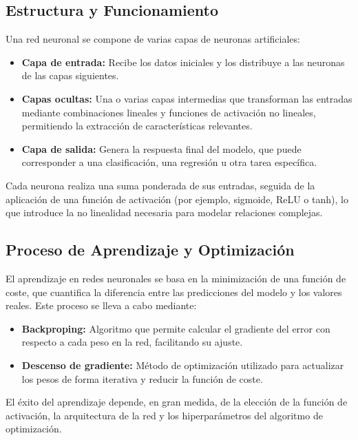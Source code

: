 \documentclass[11pt,spanish,listoffigures,listoftables]{tfgetsinf}
\begin{document}
\subsection{Estructura y Funcionamiento}
Una red neuronal se compone de varias capas de neuronas artificiales:
\begin{itemize}
    \item \textbf{Capa de entrada:} Recibe los datos iniciales y los distribuye a las neuronas de las capas siguientes.
    \item \textbf{Capas ocultas:} Una o varias capas intermedias que transforman las entradas mediante combinaciones lineales y funciones de activación no lineales, permitiendo la extracción de características relevantes.
    \item \textbf{Capa de salida:} Genera la respuesta final del modelo, que puede corresponder a una clasificación, una regresión u otra tarea específica.
\end{itemize}
Cada neurona realiza una suma ponderada de sus entradas, seguida de la aplicación de una función de activación (por ejemplo, sigmoide, ReLU o tanh), lo que introduce la no linealidad necesaria para modelar relaciones complejas.

\subsection{Proceso de Aprendizaje y Optimización}
El aprendizaje en redes neuronales se basa en la minimización de una función de coste, que cuantifica la diferencia entre las predicciones del modelo y los valores reales. Este proceso se lleva a cabo mediante:
\begin{itemize}
    \item \textbf{Backproping:} Algoritmo que permite calcular el gradiente del error con respecto a cada peso en la red, facilitando su ajuste.
    \item \textbf{Descenso de gradiente:} Método de optimización utilizado para actualizar los pesos de forma iterativa y reducir la función de coste.
\end{itemize}
El éxito del aprendizaje depende, en gran medida, de la elección de la función de activación, la arquitectura de la red y los hiperparámetros del algoritmo de optimización.
\end{document}
